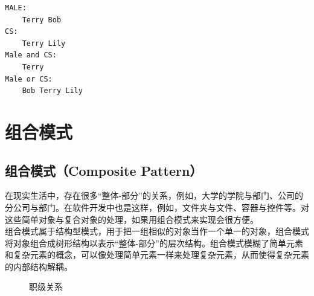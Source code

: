 \begin{tcolorbox}
    \begin{verbatim}
MALE:
    Terry Bob 
CS:
    Terry Lily 
Male and CS:
    Terry 
Male or CS:
    Bob Terry Lily
\end{verbatim}
\end{tcolorbox}

\newpage

\section{组合模式}

\subsection{组合模式（Composite Pattern）}

在现实生活中，存在很多“整体-部分”的关系，例如，大学的学院与部门、公司的分公司与部门。在软件开发中也是这样，例如，文件夹与文件、容器与控件等。对这些简单对象与复合对象的处理，如果用组合模式来实现会很方便。\\

组合模式属于结构型模式，用于把一组相似的对象当作一个单一的对象，组合模式将对象组合成树形结构以表示“整体-部分”的层次结构。组合模式模糊了简单元素和复杂元素的概念，可以像处理简单元素一样来处理复杂元素，从而使得复杂元素的内部结构解耦。\\

\begin{figure}[H]
    \centering
    \caption{职级关系}
\end{figure}

\vspace{0.5cm}

\\

